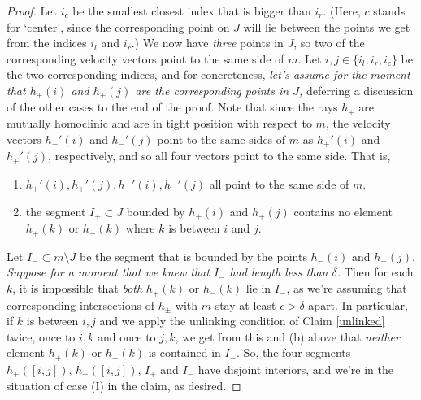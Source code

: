 \documentclass[12pt]{amsart}
\theoremstyle{definition}
\theoremstyle{remark}
\begin{document}
\begin{proof}
Let $i_c$ be the smallest closest index that is bigger than $i_r$. (Here, $c$ stands for `center', since the corresponding point on $J$ will lie between the points we get from  the indices $i_l$ and $i_r$.) We now have \emph{three} points in $J$, so two of the corresponding velocity vectors point to the same side of $m$. Let $i,j \in \{i_l,i_r,i_c\}$ be the two corresponding indices, and for concreteness, \emph{let's assume for the moment that $h_+(i)$ and $h_+(j)$ are the corresponding points in $J$,} deferring a discussion of the other cases to the end of the proof. Note that since the rays $h_\pm$ are mutually homoclinic and are in tight position with respect to $m$, the velocity vectors $h_-'(i)$ and $h_-'(j)$ point to the same sides of $m$ as $h_+'(i)$ and $h_+'(j)$, respectively, and so all four vectors point to the same side. That is, \begin{enumerate}
\item[(a)]  $h_+'(i), h_+'(j), h_-'(i), h_-'(j)$ all point to the same side of $m$.
	\item[(b)] the segment $I_+ \subset J$ bounded by $h_+(i)$ and $h_+(j)$ contains no element $h_+(k)$ or $h_-(k)$ where $k$ is between $i$ and $j$.
\end{enumerate}

Let $I_-\subset m \setminus J$ be the segment that is bounded by the points $h_-(i)$ and $h_-(j)$. \emph{Suppose for a moment that we knew that $I_-$ had length less than $\delta$.}  Then for each $k$, it is impossible that \emph{both} $h_+(k)$ or $h_-(k)$ lie in $I_-$, as we're assuming that corresponding intersections of $h_\pm$ with $m$ stay at least $\epsilon>\delta$ apart. In particular, if $k$ is between $i,j$ and we apply the unlinking condition of Claim \ref{unlinked} twice, once to $i,k$ and once to $j,k$, we get from this and (b) above that \emph{neither} element $h_+(k)$ or $h_-(k)$ is contained in $I_-$. So, the four segments $h_+([i,j])$, $h_-([i,j])$, $I_+$ and $I_-$ have disjoint interiors, and we're in the situation of case (I) in the claim, as desired.


\end{proof}
\end{document}

